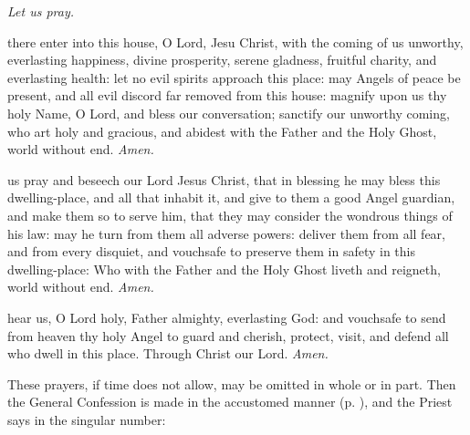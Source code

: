 
\par\noindent
\centerline{\textit{Let us pray.}}

 there enter into this house, O Lord, Jesu Christ, with the coming of us unworthy, everlasting happiness, divine prosperity, serene gladness, fruitful charity, and everlasting health: let no evil spirits approach this place: may Angels of peace be present, and all evil discord far removed from this house: magnify upon us thy holy Name, O Lord, and {} bless our conversation; sanctify our unworthy coming, who art holy and gracious, and abidest with the Father and the Holy Ghost, world without end. \textit{Amen.}\par
{} us pray and beseech our Lord Jesus Christ, that in blessing he may {} bless this dwelling-place, and all that inhabit it, and give to them a good Angel guardian, and make them so to serve him, that they may consider the wondrous things of his law: may he turn from them all adverse powers: deliver them from all fear, and from every disquiet, and vouchsafe to preserve them in safety in this dwelling-place: Who with the Father and the Holy Ghost liveth and reigneth, world without end. \textit{Amen.}\par
{}
{} hear us, O Lord holy, Father almighty, everlasting God: and vouchsafe to send from heaven thy holy Angel to guard and cherish, protect, visit, and defend all who dwell in this place. Through Christ our Lord. \textit{Amen.}
\begin{rubric}
    These prayers, if time does not allow, may be omitted in whole or in part. Then the General Confession is made in the accustomed manner (p. \pageref{Confiteor}), and the Priest says in the singular number:
\end{rubric}
